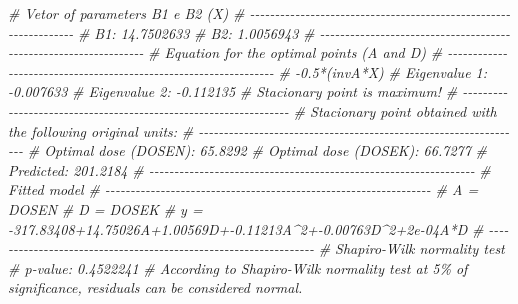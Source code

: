 \documentclass[
]{book}
\newenvironment{Shaded}{\begin{snugshade}}{\end{snugshade}}
\newcommand{\CommentTok}[1]{\textcolor[rgb]{0.56,0.35,0.01}{\textit{#1}}}
\numberwithin{equation}{section}
\begin{document}
\begin{Shaded}
\begin{Highlighting}[]
\CommentTok{\# Vetor of parameters B1 e B2 (X) }
\CommentTok{\# {-}{-}{-}{-}{-}{-}{-}{-}{-}{-}{-}{-}{-}{-}{-}{-}{-}{-}{-}{-}{-}{-}{-}{-}{-}{-}{-}{-}{-}{-}{-}{-}{-}{-}{-}{-}{-}{-}{-}{-}{-}{-}{-}{-}{-}{-}{-}{-}{-}{-}{-}{-}{-}{-}{-}{-}{-}{-}{-}{-}{-}{-}{-}{-}{-}}
\CommentTok{\# B1: 14.7502633}
\CommentTok{\# B2: 1.0056943}
\CommentTok{\# {-}{-}{-}{-}{-}{-}{-}{-}{-}{-}{-}{-}{-}{-}{-}{-}{-}{-}{-}{-}{-}{-}{-}{-}{-}{-}{-}{-}{-}{-}{-}{-}{-}{-}{-}{-}{-}{-}{-}{-}{-}{-}{-}{-}{-}{-}{-}{-}{-}{-}{-}{-}{-}{-}{-}{-}{-}{-}{-}{-}{-}{-}{-}{-}{-}}
\CommentTok{\# Equation for the optimal points (A and D) }
\CommentTok{\# {-}{-}{-}{-}{-}{-}{-}{-}{-}{-}{-}{-}{-}{-}{-}{-}{-}{-}{-}{-}{-}{-}{-}{-}{-}{-}{-}{-}{-}{-}{-}{-}{-}{-}{-}{-}{-}{-}{-}{-}{-}{-}{-}{-}{-}{-}{-}{-}{-}{-}{-}{-}{-}{-}{-}{-}{-}{-}{-}{-}{-}{-}{-}{-}{-}}
\CommentTok{\# {-}0.5*(invA*X)}
\CommentTok{\# Eigenvalue 1: {-}0.007633}
\CommentTok{\# Eigenvalue 2: {-}0.112135}
\CommentTok{\# Stacionary point is maximum!}
\CommentTok{\# {-}{-}{-}{-}{-}{-}{-}{-}{-}{-}{-}{-}{-}{-}{-}{-}{-}{-}{-}{-}{-}{-}{-}{-}{-}{-}{-}{-}{-}{-}{-}{-}{-}{-}{-}{-}{-}{-}{-}{-}{-}{-}{-}{-}{-}{-}{-}{-}{-}{-}{-}{-}{-}{-}{-}{-}{-}{-}{-}{-}{-}{-}{-}{-}{-}}
\CommentTok{\# Stacionary point obtained with the following original units: }
\CommentTok{\# {-}{-}{-}{-}{-}{-}{-}{-}{-}{-}{-}{-}{-}{-}{-}{-}{-}{-}{-}{-}{-}{-}{-}{-}{-}{-}{-}{-}{-}{-}{-}{-}{-}{-}{-}{-}{-}{-}{-}{-}{-}{-}{-}{-}{-}{-}{-}{-}{-}{-}{-}{-}{-}{-}{-}{-}{-}{-}{-}{-}{-}{-}{-}{-}{-}}
\CommentTok{\# Optimal dose (DOSEN): 65.8292}
\CommentTok{\# Optimal dose (DOSEK): 66.7277}
\CommentTok{\# Predicted: 201.2184}
\CommentTok{\# {-}{-}{-}{-}{-}{-}{-}{-}{-}{-}{-}{-}{-}{-}{-}{-}{-}{-}{-}{-}{-}{-}{-}{-}{-}{-}{-}{-}{-}{-}{-}{-}{-}{-}{-}{-}{-}{-}{-}{-}{-}{-}{-}{-}{-}{-}{-}{-}{-}{-}{-}{-}{-}{-}{-}{-}{-}{-}{-}{-}{-}{-}{-}{-}{-}}
\CommentTok{\# Fitted model }
\CommentTok{\# {-}{-}{-}{-}{-}{-}{-}{-}{-}{-}{-}{-}{-}{-}{-}{-}{-}{-}{-}{-}{-}{-}{-}{-}{-}{-}{-}{-}{-}{-}{-}{-}{-}{-}{-}{-}{-}{-}{-}{-}{-}{-}{-}{-}{-}{-}{-}{-}{-}{-}{-}{-}{-}{-}{-}{-}{-}{-}{-}{-}{-}{-}{-}{-}{-}}
\CommentTok{\# A = DOSEN}
\CommentTok{\# D = DOSEK}
\CommentTok{\# y = {-}317.83408+14.75026A+1.00569D+{-}0.11213A\^{}2+{-}0.00763D\^{}2+2e{-}04A*D}
\CommentTok{\# {-}{-}{-}{-}{-}{-}{-}{-}{-}{-}{-}{-}{-}{-}{-}{-}{-}{-}{-}{-}{-}{-}{-}{-}{-}{-}{-}{-}{-}{-}{-}{-}{-}{-}{-}{-}{-}{-}{-}{-}{-}{-}{-}{-}{-}{-}{-}{-}{-}{-}{-}{-}{-}{-}{-}{-}{-}{-}{-}{-}{-}{-}{-}{-}{-}}
\CommentTok{\# Shapiro{-}Wilk normality test}
\CommentTok{\# p{-}value:  0.4522241 }
\CommentTok{\# According to Shapiro{-}Wilk normality test at 5\% of significance, residuals can be considered normal. }

\end{Highlighting}
\end{Shaded}
\end{document}
